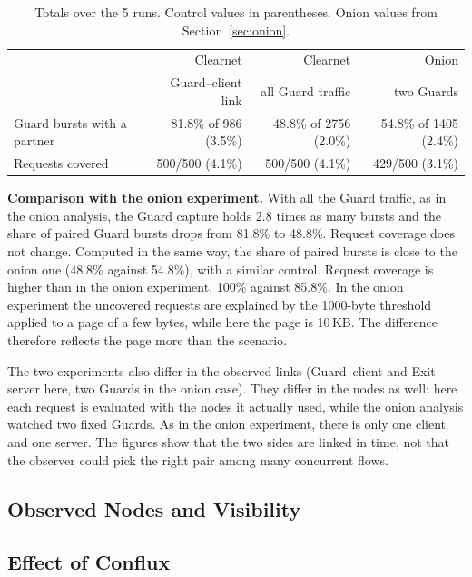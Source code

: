 \documentclass[10pt,a4paper]{article}
\numberwithin{figure}{section}
\numberwithin{table}{section}
\begin{document}
\begin{table}[htb]
\centering
\caption{Totals over the 5 runs. Control values in parentheses. Onion values from
Section~\ref{sec:onion}.}
\label{tab:clearnet-comparison}
\begin{tabular}{lrrr}
\toprule
 & Clearnet & Clearnet & Onion \\
 & Guard--client link & all Guard traffic & two Guards \\
\midrule
Guard bursts with a partner & 81.8\% of 986 (3.5\%) & 48.8\% of 2756 (2.0\%) & 54.8\% of 1405 (2.4\%) \\
Requests covered & 500/500 (4.1\%) & 500/500 (4.1\%) & 429/500 (3.1\%) \\
\bottomrule
\end{tabular}
\end{table}

\textbf{Comparison with the onion experiment.} With all the Guard traffic, as in
the onion analysis, the Guard capture holds 2.8 times as many bursts and the
share of paired Guard bursts drops from 81.8\% to 48.8\%. Request coverage does
not change. Computed in the same way, the share of paired bursts is close to the
onion one (48.8\% against 54.8\%), with a similar control. Request coverage is
higher than in the onion experiment, 100\% against 85.8\%. In the onion
experiment the uncovered requests are explained by the 1000-byte threshold
applied to a page of a few bytes, while here the page is 10\,KB. The difference
therefore reflects the page more than the scenario.

The two experiments also differ in the observed links (Guard--client and
Exit--server here, two Guards in the onion case). They differ in the nodes as
well: here each request is evaluated with the nodes it actually used, while the
onion analysis watched two fixed Guards. As in the onion experiment, there is
only one client and one server. The figures show that the two sides are linked in
time, not that the observer could pick the right pair among many concurrent
flows.

\subsection{Observed Nodes and Visibility}
\label{sec:clearnet-visibility}

\subsection{Effect of Conflux}
\label{sec:clearnet-conflux}
\end{document}
